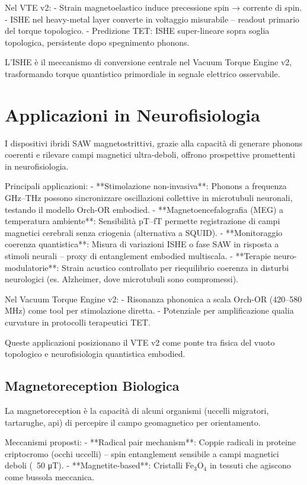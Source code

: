 \documentclass[11pt,a4paper]{article}
\begin{document}
Nel VTE v2:
- Strain magnetoelastico induce precessione spin → corrente di spin.
- ISHE nel heavy-metal layer converte in voltaggio misurabile – readout primario del torque topologico.
- Predizione TET: ISHE super-lineare sopra soglia topologica, persistente dopo spegnimento phonons.

L'ISHE è il meccanismo di conversione centrale nel Vacuum Torque Engine v2, trasformando torque quantistico primordiale in segnale elettrico osservabile.


\section{Applicazioni in Neurofisiologia}

I dispositivi ibridi SAW magnetostrittivi, grazie alla capacità di generare phonons coerenti e rilevare campi magnetici ultra-deboli, offrono prospettive promettenti in neurofisiologia.

Principali applicazioni:
- **Stimolazione non-invasiva**: Phonons a frequenza GHz–THz possono sincronizzare oscillazioni collettive in microtubuli neuronali, testando il modello Orch-OR embodied.
- **Magnetoencefalografia (MEG) a temperatura ambiente**: Sensibilità pT–fT permette registrazione di campi magnetici cerebrali senza criogenia (alternativa a SQUID).
- **Monitoraggio coerenza quantistica**: Misura di variazioni ISHE o fase SAW in risposta a stimoli neurali – proxy di entanglement embodied multiscala.
- **Terapie neuro-modulatorie**: Strain acustico controllato per riequilibrio coerenza in disturbi neurologici (es. Alzheimer, dove microtubuli sono compromessi).

Nel Vacuum Torque Engine v2:
- Risonanza phononica a scala Orch-OR (420–580 MHz) come tool per stimolazione diretta.
- Potenziale per amplificazione qualia curvature in protocolli terapeutici TET.

Queste applicazioni posizionano il VTE v2 come ponte tra fisica del vuoto topologico e neurofisiologia quantistica embodied.

\subsection{Magnetoreception Biologica}

La magnetoreception è la capacità di alcuni organismi (uccelli migratori, tartarughe, api) di percepire il campo geomagnetico per orientamento.

Meccanismi proposti:
- **Radical pair mechanism**: Coppie radicali in proteine criptocromo (occhi uccelli) – spin entanglement sensibile a campi magnetici deboli (~50 μT).
- **Magnetite-based**: Cristalli Fe$_3$O$_4$ in tessuti che agiscono come bussola meccanica.
\end{document}
